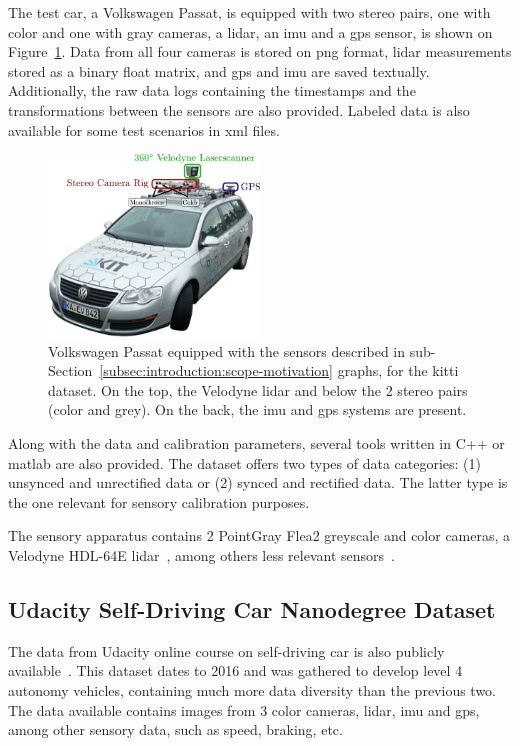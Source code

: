 The test car, a Volkswagen Passat, is equipped with two stereo pairs, one with color and one with gray cameras, a \ac{lidar}, an \ac{imu} and a \ac{gps} sensor, is shown on Figure~\ref{fig:sota:kitti_sensors}. Data from all four cameras is stored on \ac{png} format, \ac{lidar} measurements stored as a binary float matrix, and \ac{gps} and \ac{imu} are saved textually. Additionally, the raw data logs containing the timestamps and the transformations between the sensors are also provided. Labeled data is also available for some test scenarios in \ac{xml} files.

\begin{figure}[!ht]
	\centering
	\includegraphics[width=0.5\textwidth]{img/sensor_fusion/passat_sensors.jpg}
	\caption[Volkswagen Passat used for recording \acs{kitti} dataset.]{Volkswagen Passat equipped with the sensors described in sub-Section~\ref{subsec:introduction:scope-motivation} graphs, for the \ac{kitti} dataset. On the top, the Velodyne \ac{lidar} and below the 2 stereo pairs (color and grey). On the back, the \ac{imu} and \ac{gps} systems are present.}
	\label{fig:sota:kitti_sensors}
\end{figure}


Along with the data and calibration parameters, several tools written in C++ or \ac{matlab} are also provided. The dataset offers two types of data categories: (1) unsynced and unrectified data or (2) synced and rectified data. The latter type is the one relevant for sensory calibration purposes.

The sensory apparatus contains 2 PointGray Flea2 greyscale and color cameras, a Velodyne HDL-64E \ac{lidar}~\cite{VelodyneHDL64}, among others less relevant sensors~\cite{Geiger2013a}.

\subsection{Udacity Self-Driving Car Nanodegree Dataset}
The data from Udacity online course on self-driving car is also publicly available~\cite{udacity}. This dataset dates to 2016 and was gathered to develop level 4 autonomy vehicles, containing much more data diversity than the previous two. The data available contains images from 3 color cameras,  \ac{lidar}, \ac{imu} and \ac{gps}, among other sensory data, such as speed, braking, etc.

